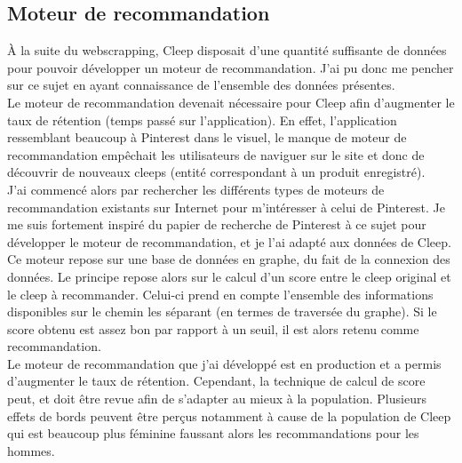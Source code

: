 \documentclass{article} %
\begin{document}
\subsection{Moteur de recommandation}
À la suite du webscrapping, Cleep disposait d'une quantité suffisante de données pour pouvoir développer un moteur de recommandation. J'ai pu donc me pencher sur ce sujet en ayant connaissance de l'ensemble des données présentes.\\
Le moteur de recommandation devenait nécessaire pour Cleep afin d'augmenter le taux de rétention (temps passé sur l'application). En effet, l'application ressemblant beaucoup à Pinterest dans le visuel, le manque de moteur de recommandation empêchait les utilisateurs de naviguer sur le site et donc de découvrir de nouveaux cleeps (entité correspondant à un produit enregistré).\\
J'ai commencé alors par rechercher les différents types de moteurs de recommandation existants sur Internet pour m'intéresser à celui de Pinterest. Je me suis fortement inspiré du papier de recherche de Pinterest à ce sujet pour développer le moteur de recommandation, et je l'ai adapté aux données de Cleep. Ce moteur repose sur une base de données en graphe, du fait de la connexion des données. Le principe repose alors sur le calcul d'un score entre le cleep original et le cleep à recommander. Celui-ci prend en compte l'ensemble des informations disponibles sur le chemin les séparant (en termes de traversée du graphe). Si le score obtenu est assez bon par rapport à un seuil, il est alors retenu comme recommandation.\\
Le moteur de recommandation que j'ai développé est en production et a permis d'augmenter le taux de rétention. Cependant, la technique de calcul de score peut, et doit être revue afin de s'adapter au mieux à la population. Plusieurs effets de bords peuvent être perçus notamment à cause de la population de Cleep qui est beaucoup plus féminine faussant alors les recommandations pour les hommes.\\
\end{document}
